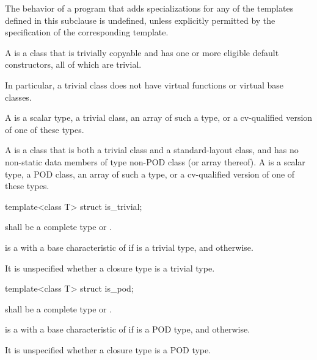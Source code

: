 \pnum
The behavior of a program that adds specializations for
any of the templates defined in this subclause is undefined,
unless explicitly permitted by the specification of the corresponding template.

\pnum
\label{term.trivial.type}%
A  is a class that is trivially copyable and
has one or more eligible default constructors, all of which are trivial.
\begin{note}
In particular,
a trivial class does not have virtual functions or virtual base classes.
\end{note}
A  is a scalar type, a trivial class,
an array of such a type, or a cv-qualified version of one of these types.

\pnum
{}%
A  is a class that is both a trivial class and a
standard-layout class, and has no non-static data members of type non-POD class
(or array thereof). A  is a scalar type, a POD class, an array
of such a type, or a cv-qualified version of one of these types.

%
\begin{itemdecl}
template<class T> struct is_trivial;
\end{itemdecl}

\begin{itemdescr}
\pnum
\expects
{} shall be a complete type or \cv{} .

\pnum
\remarks
{} is a 
with a base characteristic of 
if  is a trivial type,
and  otherwise.

\pnum
\begin{note}
It is unspecified
whether a closure type is a trivial type.
\end{note}
\end{itemdescr}

%
\begin{itemdecl}
template<class T> struct is_pod;
\end{itemdecl}

\begin{itemdescr}
\pnum
\expects
{} shall be a complete type or \cv{} .

\pnum
\remarks
{} is a 
with a base characteristic of 
if  is a POD type,
and  otherwise.

\pnum
\begin{note}
It is unspecified whether a closure type is a POD type.
\end{note}
\end{itemdescr}

